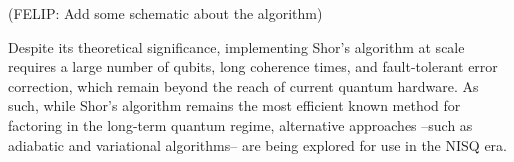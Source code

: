 {\color{red}(FELIP: Add some schematic about the algorithm)}

Despite its theoretical significance, implementing Shor's algorithm at scale requires a
large number of qubits, long coherence times, and fault-tolerant error correction,
which remain beyond the reach of current quantum hardware. As such, while Shor's algorithm remains
the most efficient known method for factoring in the long-term quantum regime, alternative approaches
--such as adiabatic and variational algorithms-- are being explored for use in the NISQ era.